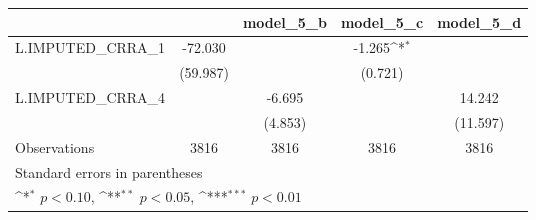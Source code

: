 {
\def\sym#1{\ifmmode^{#1}\else\(^{#1}\)\fi}
\begin{tabular}{l*{4}{c}}
\toprule
                &\multicolumn{1}{c}{}&\multicolumn{1}{c}{model\_5\_b}&\multicolumn{1}{c}{model\_5\_c}&\multicolumn{1}{c}{model\_5\_d}\\
\midrule
L.IMPUTED\_CRRA\_1&  -72.030         &                  &   -1.265\sym{*}  &                  \\
                & (59.987)         &                  &  (0.721)         &                  \\
\addlinespace
L.IMPUTED\_CRRA\_4&                  &   -6.695         &                  &   14.242         \\
                &                  &  (4.853)         &                  & (11.597)         \\
\midrule
Observations    &     3816         &     3816         &     3816         &     3816         \\
\bottomrule
\multicolumn{5}{l}{\footnotesize Standard errors in parentheses}\\
\multicolumn{5}{l}{\footnotesize \sym{*} \(p<0.10\), \sym{**} \(p<0.05\), \sym{***} \(p<0.01\)}\\
\end{tabular}
}
